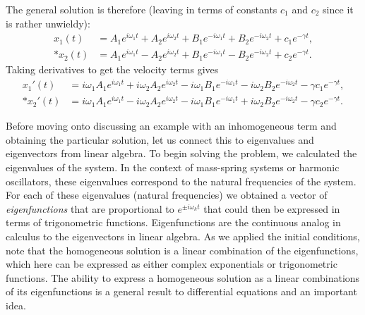 The general solution is therefore (leaving in terms of constants $c_1$ and $c_2$ since it is rather unwieldy):
\begin{subequations}
\begin{align}
  x_1(t) &= A_1 e^{i \omega_1 t} + A_2 e^{i \omega_2 t} + B_1 e^{-i \omega_1 t} + B_2 e^{-i \omega_2 t} + c_1 e^{-\gamma t} , \\*
  x_2(t) &= A_1 e^{i \omega_1 t} - A_2 e^{i \omega_2 t} + B_1 e^{-i \omega_1 t} - B_2 e^{-i \omega_2 t} + c_2 e^{-\gamma t} .
\end{align}
\end{subequations}
Taking derivatives to get the velocity terms gives
\begin{subequations}
\begin{align}
  x_1'(t) &= i \omega_1 A_1 e^{i \omega_1 t} + i \omega_2 A_2 e^{i \omega_2 t} - i \omega_1 B_1 e^{-i \omega_1 t} - i \omega_2 B_2 e^{-i \omega_2 t} - \gamma c_1 e^{-\gamma t} , \\*
  x_2'(t) &= i \omega_1 A_1 e^{i \omega_1 t} - i \omega_2 A_2 e^{i \omega_2 t} - i \omega_1 B_1 e^{-i \omega_1 t} + i \omega_2 B_2 e^{-i \omega_2 t} - \gamma c_2 e^{-\gamma t} .
\end{align}
\end{subequations}

Before moving onto discussing an example with an inhomogeneous term and obtaining the particular solution, let us connect this to eigenvalues and eigenvectors from linear algebra. To begin solving the problem, we calculated the eigenvalues of the system. In the context of mass-spring systems or harmonic oscillators, these eigenvalues correspond to the natural frequencies of the system. For each of these eigenvalues (natural frequencies) we obtained a vector of \emph{eigenfunctions} that are proportional to $e^{\pm i \omega_k t}$ that could then be expressed in terms of trigonometric functions. Eigenfunctions are the continuous analog in calculus to the eigenvectors in linear algebra. As we applied the initial conditions, note that the homogeneous solution is a linear combination of the eigenfunctions, which here can be expressed as either complex exponentials or trigonometric functions. The ability to express a homogeneous solution as a linear combinations of its eigenfunctions is a general result to differential equations and an important idea.

